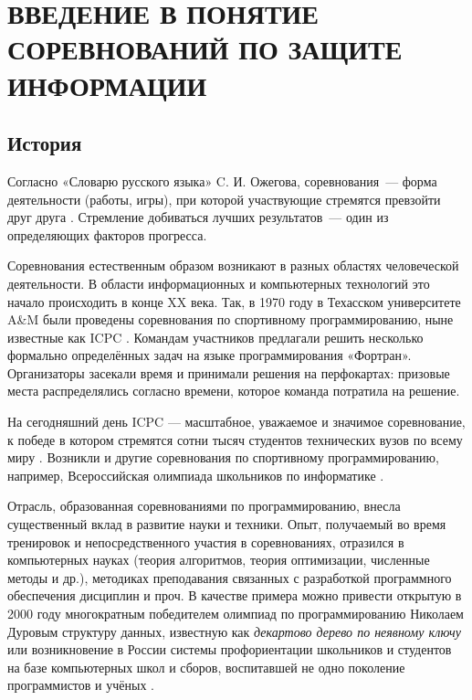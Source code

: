 \chapter{ВВЕДЕНИЕ В ПОНЯТИЕ СОРЕВНОВАНИЙ ПО ЗАЩИТЕ ИНФОРМАЦИИ}
\label{cha:analysis}

\section{История}
\label{cha:analysis:history}

Согласно «Словарю русского языка» C. И. Ожегова, соревнования~--- форма деятельности (работы, игры), при которой участвующие стремятся превзойти друг друга \cite{Ozhegov89}. Стремление добиваться лучших результатов~--- один из определяющих факторов прогресса.


Соревнования естественным образом возникают в разных областях человеческой деятельности. В области информационных и компьютерных технологий это начало происходить в конце XX века. Так, в 1970 году в Техасском университете A\&M были проведены соревнования по спортивному программированию, ныне известные как ICPC \cite{AboutICPC}. Командам участников предлагали решить несколько формально определённых задач на языке программирования «Фортран». Организаторы засекали время и принимали решения на перфокартах: призовые места распределялись согласно времени, которое команда потратила на решение.

На сегодняшний день ICPC — масштабное, уважаемое и значимое соревнование, к победе в котором стремятся сотни тысяч студентов технических вузов по всему миру \cite{AboutICPC}. Возникли и другие соревнования по спортивному программированию, например, Всероссийская олимпиада школьников по информатике \cite{ROI}.

Отрасль, образованная соревнованиями по программированию, внесла существенный вклад в развитие науки и техники. Опыт, получаемый во время тренировок и непосредственного участия в соревнованиях, отразился в компьютерных науках (теория алгоритмов, теория оптимизации, численные методы и др.), методиках преподавания связанных с разработкой программного обеспечения дисциплин и проч. В качестве примера можно привести открытую в 2000 году многократным победителем олимпиад по программированию Николаем Дуровым структуру данных, известную как \textit{декартово дерево по неявному ключу} \cite{Durov00} или возникновение в России системы профориентации школьников и студентов на базе компьютерных школ и сборов, воспитавшей не одно поколение программистов и учёных \cite{Netrusova09} \cite{Kraivanova12}.

